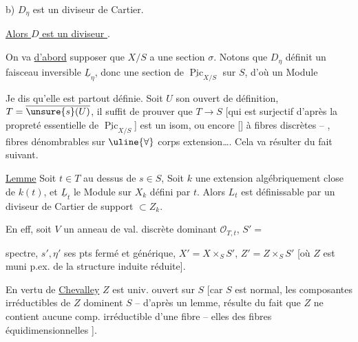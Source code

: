 b) $D_\eta$ est un diviseur de Cartier.

\uline{Alors $D$ est un diviseur }.


On va \uline{d'abord} supposer que $X/S$ a une section $\sigma$. Notons que $D_\eta$ définit un faisceau inversible $\underline L_\eta$, donc une section  de $\underline{\operatorname{Pic}}_{X/S}$ sur $S$, d'où un Module

 Je dis qu'elle est partout définie. Soit $U$ son ouvert de définition, $T=\overline{\unsure{s}(U)}$, il suffit de prouver que $T\longrightarrow S$ [qui est  surjectif d'après la propreté essentielle de $\underline{\operatorname{Pic}}_{X/S}$] est un isom, ou encore [] à fibres discrètes -- , fibres  dénombrables sur $\uline{\forall}$ corps extension\ldots. Cela va résulter du fait suivant.

\uline{Lemme} Soit $t\in T$ au dessus de $s\in S$,  Soit $k$ une  extension algébriquement close de $k(t)$, et $\underline L_t$ le Module sur $X_k$ défini par $t$. Alors $L_t$ est définissable par un diviseur de Cartier de support $\subset Z_k$.

En eff, soit $V$ un anneau de val. discrète dominant $\mathcal O_{T,t}$, $S'=$

spectre, $s',\eta'$ ses pts fermé et générique, $X'=X\times_SS'$, $Z'=Z\times_SS'$ [où $Z$ est muni p.ex. de la structure induite réduite].

 En vertu de \uline{Chevalley}  $Z$ est univ. ouvert sur $S$ [car $S$ est normal, les composantes irréductibles de $Z$ dominent $S$ -- \unsure{:} d'après un lemme, résulte du fait que $Z$ ne contient aucune comp. irréductible d'une fibre -- elles  des fibres équidimensionnelles ].

